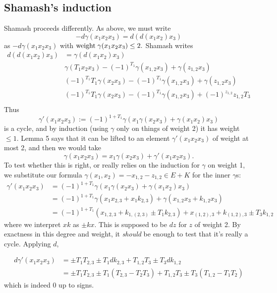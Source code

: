 \documentclass[11pt]{amsart}
\def\g{{\gamma}}
\def\w{{\rm weight}}
\begin{document}
\subsection{Shamash's induction} Shamash proceeds differently. As above, we must write 
$$
-d\g(x_{1}x_{2}x_{3}) = d(d(x_{1}x_{2})x_{3}) 
$$
as $-d\g(x_{1}x_{2}x_{3})$ with $\w\; \g(x_{1}x_{2}x_{3})\leq 2.$ 
Shamash writes
\begin{align*}
d(d(x_{1}x_{2})x_{3})  &= \gamma(d(x_{1}x_{2})x_{3})\\ 
&\g(T_1x_2x_3) -(-1)^{T_1}\g(x_{1,2}x_3) +\g(z_{1,2}x_3)\\
&(-1)^{T_1}T_1\g(x_2x_3) -(-1)^{T_1}\g(x_{1,2}x_3) +\g(z_{1,2}x_3)\\
&(-1)^{T_1}T_1\g(x_2x_3) -(-1)^{T_1}\g(x_{1,2}x_3) +(-1)^{z_{1,2}}z_{1,2}T_3\\
\end{align*}
Thus 
$$
\g'(x_{1}x_{2}x_{3}) := (-1)^{1+T_{1}}\g(x_{1}\gamma(x_{2}x_{3})+\g(x_{1}x_{2})x_{3})
$$
is a cycle, and by induction (using $\g$ only on things of weight 2) it has weight $\leq 1$.  Lemma 5 says that it can be lifted to an element $\g'(x_{1}x_{2}x_{3})$ of weight at most 2, and then we would take
$$
\g(x_{1}x_{2}x_{3}) = x_{1}\g(x_{2}x_{3}) +\g'(x_{1}x_{2}x_{3}).
$$
To test whether this is right, or really relies on the induction for $\g$ on weight 1, we substitute our formula
$\g(x_1,x_2)=-x_{1,2}-z_{1,2} \in E+K$ for the inner $\g$s:
\begin{align*}
\g'(x_{1}x_{2}x_{3}) &= (-1)^{1+T_{1}} \g(x_{1}\g(x_{2}x_{3})+\g(x_{1}x_{2})x_{3})\\
&= (-1)^{1+T_{1}}\g(x_{1}x_{2,3}+x_{1}k_{2,3}) + \g(x_{1,2}x_{3}+k_{1,2}x_{3})\\
&= (-1)^{1+T_{1}}(x_{1,2,3}+k_{1,(2,3)}\pm T_{1}k_{2,3})
+ x_{(1,2),3}+k_{(1,2),3}\pm T_{3}k_{1,2}
\end{align*}
where we interpret $xk$ as $\pm kx$. This is supposed to be $dz$ for $z$ of weight 2. By exactness in this
degree and weight, it \emph{should} be enough to test that it's really a cycle. Applying $d$,

\begin{align*}
 d\g'(x_{1}x_{2}x_{3}) &= \pm T_{1}T_{2,3}\pm T_{1}dk_{2,3} +T_{1,2}T_{3}\pm T_{3}dk_{1,2}\\
 &= \pm T_{1}T_{2,3}\pm T_{1}(T_{2,3}-T_{2}T_{3}) +T_{1,2}T_{3}\pm T_{3}(T_{1,2}-T_{1}T_{2})
\end{align*}
which is indeed 0 up to signs.
\end{document}
